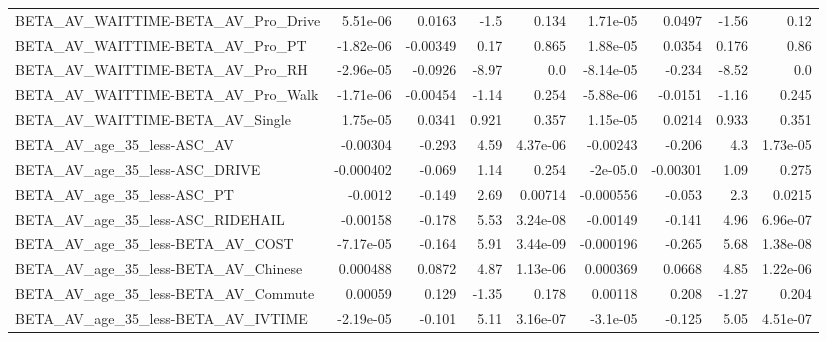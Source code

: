 \begin{tabular}{lrrrrrrrr}
BETA\_AV\_WAITTIME-BETA\_AV\_Pro\_Drive                 &    5.51e-06 &       0.0163 &      -1.5 &    0.134 &   1.71e-05 &      0.0497 &        -1.56 &          0.12 \\
BETA\_AV\_WAITTIME-BETA\_AV\_Pro\_PT                    &   -1.82e-06 &     -0.00349 &      0.17 &    0.865 &   1.88e-05 &      0.0354 &        0.176 &          0.86 \\
BETA\_AV\_WAITTIME-BETA\_AV\_Pro\_RH                    &   -2.96e-05 &      -0.0926 &     -8.97 &      0.0 &  -8.14e-05 &      -0.234 &        -8.52 &           0.0 \\
BETA\_AV\_WAITTIME-BETA\_AV\_Pro\_Walk                  &   -1.71e-06 &     -0.00454 &     -1.14 &    0.254 &  -5.88e-06 &     -0.0151 &        -1.16 &         0.245 \\
BETA\_AV\_WAITTIME-BETA\_AV\_Single                    &    1.75e-05 &       0.0341 &     0.921 &    0.357 &   1.15e-05 &      0.0214 &        0.933 &         0.351 \\
BETA\_AV\_age\_35\_less-ASC\_AV                         &    -0.00304 &       -0.293 &      4.59 & 4.37e-06 &   -0.00243 &      -0.206 &          4.3 &      1.73e-05 \\
BETA\_AV\_age\_35\_less-ASC\_DRIVE                      &   -0.000402 &       -0.069 &      1.14 &    0.254 &   -2e-05.0 &    -0.00301 &         1.09 &         0.275 \\
BETA\_AV\_age\_35\_less-ASC\_PT                         &     -0.0012 &       -0.149 &      2.69 &  0.00714 &  -0.000556 &      -0.053 &          2.3 &        0.0215 \\
BETA\_AV\_age\_35\_less-ASC\_RIDEHAIL                   &    -0.00158 &       -0.178 &      5.53 & 3.24e-08 &   -0.00149 &      -0.141 &         4.96 &      6.96e-07 \\
BETA\_AV\_age\_35\_less-BETA\_AV\_COST                   &   -7.17e-05 &       -0.164 &      5.91 & 3.44e-09 &  -0.000196 &      -0.265 &         5.68 &      1.38e-08 \\
BETA\_AV\_age\_35\_less-BETA\_AV\_Chinese                &    0.000488 &       0.0872 &      4.87 & 1.13e-06 &   0.000369 &      0.0668 &         4.85 &      1.22e-06 \\
BETA\_AV\_age\_35\_less-BETA\_AV\_Commute                &     0.00059 &        0.129 &     -1.35 &    0.178 &    0.00118 &       0.208 &        -1.27 &         0.204 \\
BETA\_AV\_age\_35\_less-BETA\_AV\_IVTIME                 &   -2.19e-05 &       -0.101 &      5.11 & 3.16e-07 &   -3.1e-05 &      -0.125 &         5.05 &      4.51e-07 \\

\end{tabular}

